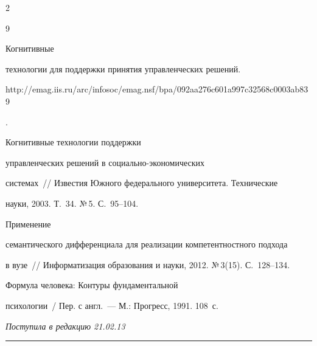 \begin{multicols}{2}
{{\begin{thebibliography}{9}


 Когнитивные 


технологии для поддержки принятия управ\-лен\-че\-ских решений. {\sf 


http://emag.iis.ru/arc/infosoc/\linebreak emag.nsf/bpa/092aa276c601a997c32568c0003ab839}.




 Когнитивные технологии поддержки 


управ\-лен\-че\-ских решений в со\-ци\-аль\-но-эко\-но\-ми\-че\-ских 


сис\-те\-мах~// Известия Южного федерального университета. Технические 


науки, 2003. Т.~34. №\,5. С.~95--104.




 Применение 


семантического дифференциала для реализации компетентностного подхода 


в вузе~// Информатизация образования и науки, 2012. №\,3(15). С.~128--134.




 Формула человека: Контуры фундаментальной 


психологии~/ Пер. с англ.~--- М.: Прогресс, 1991. 108~с.


\end{thebibliography}


} }





\end{multicols}





\vspace*{-12pt}





\hfill{\small\textit{Поступила в редакцию 21.02.13}}








\vspace*{12pt}





\hrule





